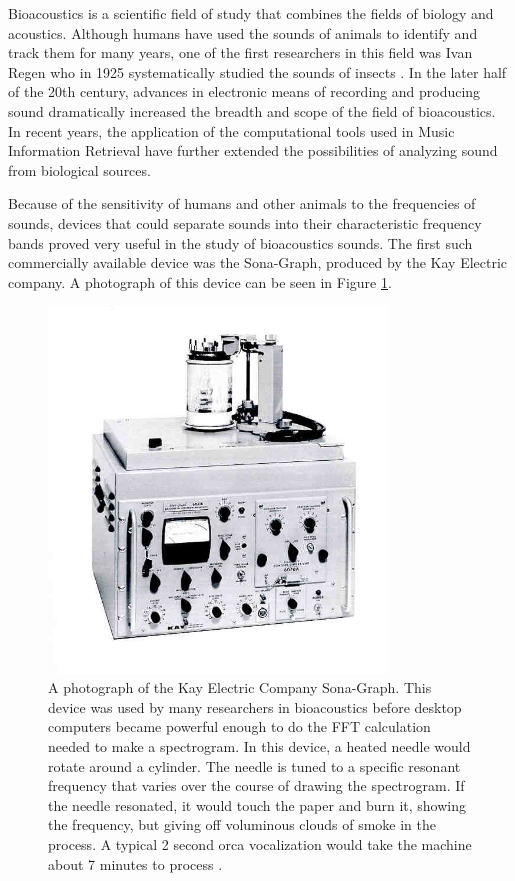 \documentclass[12pt,oneside]{book}
\begin{document}
Bioacoustics is a scientific field of study that combines the fields
of biology and acoustics.  Although humans have used the sounds of
animals to identify and track them for many years, one of the first
researchers in this field was Ivan Regen who in 1925 systematically
studied the sounds of insects \cite{zarnik1929zivot}.  In the later
half of the 20th century, advances in electronic means of recording
and producing sound dramatically increased the breadth and scope of
the field of bioacoustics.  In recent years, the application of the
computational tools used in Music Information Retrieval have further
extended the possibilities of analyzing sound from biological sources.

Because of the sensitivity of humans and other animals to the
frequencies of sounds, devices that could separate sounds into their
characteristic frequency bands proved very useful in the study of
bioacoustics sounds.  The first such commercially available device was
the Sona-Graph, produced by the Kay Electric company.  A photograph of
this device can be seen in Figure \ref{fig:kayElectricSonagram}.

\begin{figure}[t]
\centering
\includegraphics[width=90mm]{figures/kayElectricSonagram}
\caption{A photograph of the Kay Electric Company Sona-Graph.  This
  device was used by many researchers in bioacoustics before desktop
  computers became powerful enough to do the FFT calculation needed to
  make a spectrogram.  In this device, a heated needle would rotate
  around a cylinder.  The needle is tuned to a specific resonant
  frequency that varies over the course of drawing the spectrogram.
  If the needle resonated, it would touch the paper and burn it,
  showing the frequency, but giving off voluminous clouds of smoke in
  the process.  A typical 2 second orca vocalization would take the
  machine about 7 minutes to process \cite{lindblom1962accuracy}. }
\label{fig:kayElectricSonagram}
\end{figure}
\end{document}
